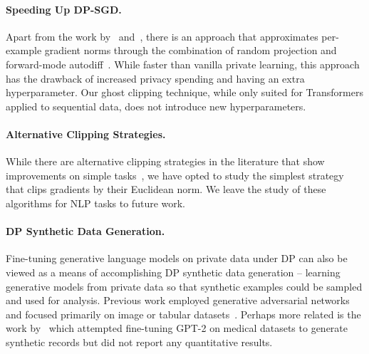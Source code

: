 \paragraph{Speeding Up DP-SGD.}
Apart from the work by~\cite{lee2020scaling} and~\cite{subramani2020enabling}, there is an approach that approximates per-example gradient norms through the combination of random projection and forward-mode autodiff~\citep{bu2021fast}.
While faster than vanilla private learning, this approach has the drawback of increased privacy spending and having an extra hyperparameter.
Our ghost clipping technique, while only suited for Transformers applied to sequential data, does not introduce new hyperparameters.

\paragraph{Alternative Clipping Strategies.}
While there are alternative clipping strategies in the literature that show improvements on simple tasks~\citep{pichapati2019adaclip,asi2021private}, we have opted to study the simplest strategy that clips gradients by their Euclidean norm.
We leave the study of these algorithms for NLP tasks to future work.

\paragraph{DP Synthetic Data Generation.}
Fine-tuning generative language models on private data under DP can also be viewed as a means of accomplishing DP synthetic data generation -- learning generative models from private data so that synthetic examples could be sampled and used for analysis. 
Previous work employed generative adversarial networks and focused primarily on image or tabular datasets~\citep{torkzadehmahani2019dp,neunhoeffer2020private,chen2020gs,torfi2020differentially}. 
Perhaps more related is the work by~\cite{bommasani19towards} which attempted fine-tuning GPT-2 on medical datasets to generate synthetic records but did not report any quantitative results. 
